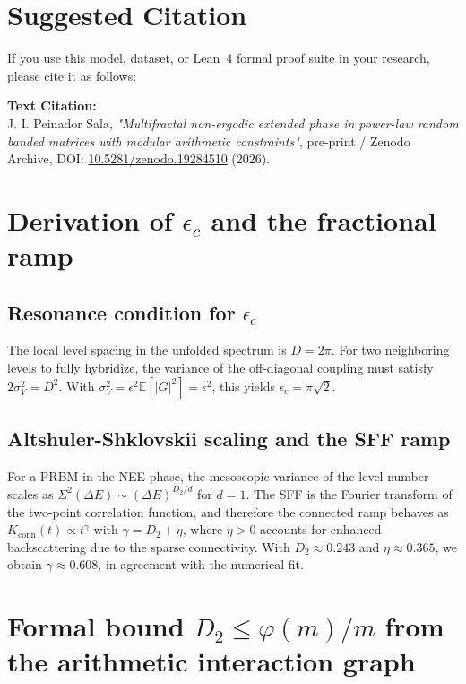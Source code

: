\documentclass[11pt,a4paper]{article}
\begin{document}
\section*{Suggested Citation}
If you use this model, dataset, or Lean~4 formal proof suite in your research, please cite it as follows:

\vspace{0.5em}
\noindent \textbf{Text Citation:} \\
J. I. Peinador Sala, \textit{"Multifractal non-ergodic extended phase in power-law random banded matrices with modular arithmetic constraints"}, pre-print / Zenodo Archive, DOI: \href{https://doi.org/10.5281/zenodo.19284510}{10.5281/zenodo.19284510} (2026).

\appendix

\section{Derivation of \texorpdfstring{$\epsilon_c$}{epsilon\_c} and the fractional ramp}
\label{app:ramp}

\subsection{Resonance condition for \texorpdfstring{$\epsilon_c$}{epsilon\_c}}
The local level spacing in the unfolded spectrum is $D=2\pi$. For two neighboring levels to fully hybridize, the variance of the off-diagonal coupling must satisfy $2\sigma_V^2 = D^2$. With $\sigma_V^2 = \epsilon^2 \mathbb{E}[|G|^2] = \epsilon^2$, this yields $\epsilon_c = \pi\sqrt{2}$.

\subsection{Altshuler-Shklovskii scaling and the SFF ramp}
For a PRBM in the NEE phase, the mesoscopic variance of the level number scales as $\Sigma^2(\Delta E) \sim (\Delta E)^{D_2/d}$ for $d=1$. The SFF is the Fourier transform of the two-point correlation function, and therefore the connected ramp behaves as $K_{\text{conn}}(t) \propto t^{\gamma}$ with $\gamma = D_2 + \eta$, where $\eta>0$ accounts for enhanced backscattering due to the sparse connectivity. With $D_2\approx0.243$ and $\eta\approx0.365$, we obtain $\gamma\approx0.608$, in agreement with the numerical fit.

\section{Formal bound \texorpdfstring{$D_2 \le \varphi(m)/m$}{D2 <= phi(m)/m} from the arithmetic interaction graph}
\label{app:bound}
\end{document}
